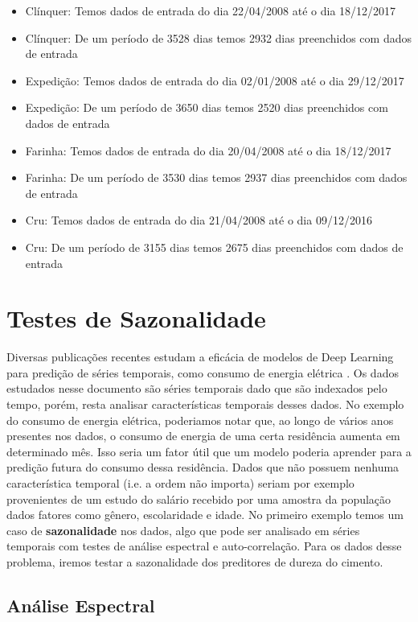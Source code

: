 \begin{itemize}
\item Clínquer: Temos dados de entrada do dia 22/04/2008 até o dia 18/12/2017
\item Clínquer: De um período de 3528 dias temos 2932 dias preenchidos com dados de entrada
\item Expedição: Temos dados de entrada do dia 02/01/2008 até o dia 29/12/2017
\item Expedição: De um período de 3650 dias temos 2520 dias preenchidos com dados de entrada
\item Farinha: Temos dados de entrada do dia 20/04/2008 até o dia 18/12/2017
\item Farinha: De um período de 3530 dias temos 2937 dias preenchidos com dados de entrada
\item Cru: Temos dados de entrada do dia 21/04/2008 até o dia 09/12/2016
\item Cru: De um período de 3155 dias temos 2675 dias preenchidos com dados de entrada
\end{itemize}


\section{Testes de Sazonalidade}

Diversas publicações recentes estudam a eficácia de modelos de Deep Learning para predição de séries temporais, como consumo de energia elétrica \citep{lstmbr}. Os dados estudados nesse documento são séries temporais dado que são indexados pelo tempo, porém, resta analisar características temporais desses dados. No exemplo do consumo de energia elétrica, poderiamos notar que, ao longo de vários anos presentes nos dados, o consumo de energia de uma certa residência aumenta em determinado mês. Isso seria um fator útil que um modelo poderia aprender para a predição futura do consumo dessa residência. Dados que não possuem nenhuma característica temporal (i.e. a ordem não importa) seriam por exemplo provenientes de um estudo do salário recebido por uma amostra da população dados fatores como gênero, escolaridade e idade. No primeiro exemplo temos um caso de \textbf{sazonalidade} nos dados, algo que pode ser analisado em séries temporais com testes de análise espectral e auto-correlação. Para os dados desse problema, iremos testar a sazonalidade dos preditores de dureza do cimento.

\subsection{Análise Espectral}

